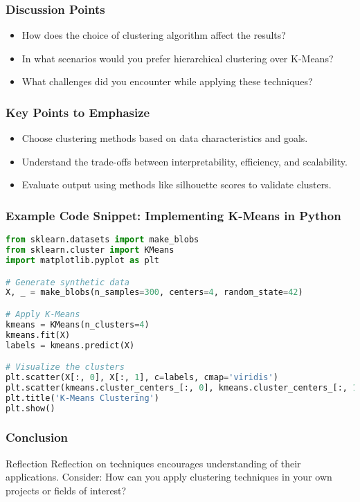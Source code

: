 \documentclass[aspectratio=169]{beamer}
\begin{document}
\begin{frame}
  \frametitle{Discussion Points}
  \begin{itemize}
    \item How does the choice of clustering algorithm affect the results?
    \item In what scenarios would you prefer hierarchical clustering over K-Means?
    \item What challenges did you encounter while applying these techniques?
  \end{itemize}
\end{frame}

\begin{frame}
  \frametitle{Key Points to Emphasize}
  \begin{itemize}
    \item Choose clustering methods based on data characteristics and goals.
    \item Understand the trade-offs between interpretability, efficiency, and scalability.
    \item Evaluate output using methods like silhouette scores to validate clusters.
  \end{itemize}
\end{frame}

\begin{frame}[fragile]
  \frametitle{Example Code Snippet: Implementing K-Means in Python}
  \begin{lstlisting}[language=Python]
from sklearn.datasets import make_blobs
from sklearn.cluster import KMeans
import matplotlib.pyplot as plt

# Generate synthetic data
X, _ = make_blobs(n_samples=300, centers=4, random_state=42)

# Apply K-Means
kmeans = KMeans(n_clusters=4)
kmeans.fit(X)
labels = kmeans.predict(X)

# Visualize the clusters
plt.scatter(X[:, 0], X[:, 1], c=labels, cmap='viridis')
plt.scatter(kmeans.cluster_centers_[:, 0], kmeans.cluster_centers_[:, 1], s=300, c='red')
plt.title('K-Means Clustering')
plt.show()
  \end{lstlisting}
\end{frame}

\begin{frame}
  \frametitle{Conclusion}
  \begin{block}{Reflection}
    Reflection on techniques encourages understanding of their applications.
    Consider: How can you apply clustering techniques in your own projects or fields of interest?
  \end{block}
\end{frame}
\end{document}
